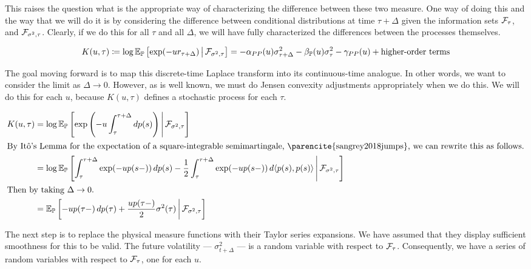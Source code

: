 \documentclass[11pt, letterpaper, twoside, final]{article}
\begin{document}
This raises the question what is the appropriate way of characterizing the difference between these two measure.
One way of doing this and the way that we will do it is by considering the difference between conditional
distributions at time $\tau + \Delta$ given the information sets $\mathcal{F}_{\tau}$, and $\mathcal{F}_{\sigma^2, \tau}$.
Clearly, if we do this for all $\tau$ and all $\Delta$, we will have fully characterized the differences between
the processes themselves.




\begin{equation}
    \label{eqn:cumulant_generating_function_for_delta}
    K(u, \tau) \coloneqq \log \operatorname{\mathbb{E}}_{\mathbb{P}}\left[\exp(-u r_{\tau + \Delta}) \,\middle\vert\, \mathcal{F}_{\sigma^2, \tau}\right] = -
    \alpha_{PP}(u) \sigma^2_{\tau + \Delta} - \beta_{\mathbb{P}}(u) \sigma^2_{\tau} - \gamma_{PP}(u) + \text{higher-order
    terms}
\end{equation}

The goal moving forward is to map this discrete-time Laplace transform into its continuous-time analogue. 
In other words, we want to consider the limit as $\Delta \to 0$.
However, as is well known, we must do Jensen convexity adjustments appropriately when we do this.
We will do this for each $u$, because $K(u,\tau)$ defines a stochastic process for each $\tau$.

\begin{align}
    K(u, \tau) &= \log \E_{\PP}\left[\exp\left(-u \int_{\tau}^{\tau + \Delta} \dif p(s)\right) \mvert
        \F_{\sigma^2, \tau}\right] \\ 
    \intertext{By It\^{o}'s Lemma for the expectation of a square-integrable semimartingale,
        \parencite{sangrey2018jumps}, we can rewrite this as follows.} 
     &= \log \E_{\PP} \left[\int_{\tau}^{\tau+\Delta} \exp(-u p(s-)) \dif p(s) - \frac{1}{2}
        \int_{\tau}^{\tau+\Delta} \exp(- u p(s-)) \dif \langle p(s), p(s) \rangle \mvert \F_{\sigma^2, \tau}
        \right] \\
    \intertext{Then by taking $\Delta \to 0$.}
    &= \E_{\PP} \left[ -u p(\tau-) \dif p(\tau)  + \frac{u p(\tau-) }{2} \sigma^2(\tau)  \mvert \F_{\sigma^2, \tau}
       \right] 
\end{align}

The next step is to replace the physical measure functions with their Taylor series expansions.
We have assumed that they display sufficient smoothness for this to be valid.
The future volatility --- $\sigma^2_{t+\Delta}$ --- is a random variable with respect to $\mathcal{F}_{\tau}$.
Consequently, we have a series of random variables with respect to $\mathcal{F}_\tau$, one for each $u$.
\end{document}
